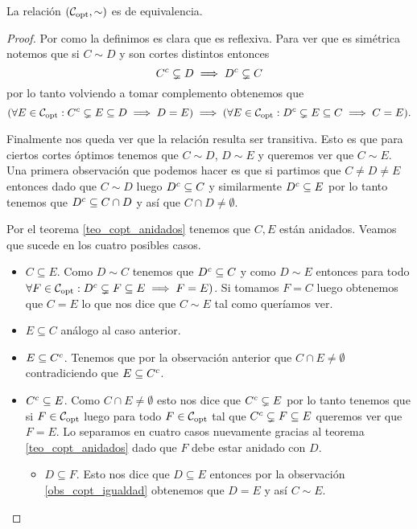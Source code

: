 \documentclass[tesis.tex]{subfiles}
\begin{document}
\begin{prop}
	La relación $({\cal C}_{\text{opt}}, \sim)$ es de equivalencia.
\end{prop}
\begin{proof}
	Por como la definimos es clara que es reflexiva.
	Para ver que es simétrica notemos que si $C \sim D$ y son cortes distintos entonces  
	\[
		C^{c} \subsetneq D \implies D^{c} \subsetneq C
	\]
	por lo tanto volviendo a tomar complemento obtenemos que
	\[
(	\forall E \in {\cal C}_{\text{opt}} : C^{c} \subsetneq E \subseteq D \implies D = E) \implies 
	(\forall E \in {\cal C}_{\text{opt}} : D^{c} \subsetneq E \subseteq C \implies C = E).
	\]
	
	Finalmente nos queda ver que la relación resulta ser transitiva.
	Esto es que para ciertos cortes óptimos tenemos que $C \sim D$, $D \sim E$ y queremos ver que $C \sim E$.
	Una primera observación que podemos hacer es que si partimos que $C \neq D \neq E$ entonces dado que $C \sim D$ luego $D^{c} \subseteq C$ y similarmente $D^{c} \subseteq E$ por lo tanto tenemos que $D^{c} \subseteq C \cap D$ y así que $C \cap D \neq \emptyset$.

	Por el teorema \ref{teo_copt_anidados} tenemos que $C,E$ están anidados.
	Veamos que sucede en los cuatro posibles casos.
	\begin{itemize}
		\item $C \subseteq E$. 
		Como $D \sim C$ tenemos que $ D^{c} \subseteq C $ y como $D \sim E$ entonces para todo $\forall F \in {\cal C}_{\text{opt}} : D^{c} \subsetneq F \subseteq E \implies F = E)$. 
		Si tomamos $F = C$ luego obtenemos que $C = E$ lo que nos dice que $C \sim E$ tal como queríamos ver.
		
		
		\item $E \subseteq C$ análogo al caso anterior.
		\item $E \subseteq C^{c}$.
		Tenemos que por la observación anterior que $C \cap E \neq \emptyset$ contradiciendo que $E \subseteq C^{c}$.
		\item $C^{c} \subseteq E$.
		Como $C \cap E \neq \emptyset$ esto nos dice que $C^{c} \subsetneq E$ por lo tanto tenemos que si $F \in {\cal C}_{\text{opt}}$ luego para todo $F \in {\cal C}_{\text{opt}}$ tal que $C^{c} \subsetneq F \subseteq E$ queremos ver que $F=E$.
		Lo separamos en cuatro casos nuevamente gracias al teorema \ref{teo_copt_anidados} dado que $F$ debe estar anidado con $D$.
		\begin{itemize}
			\item $D \subseteq F$.
			Esto nos dice que $D \subseteq E$ entonces por la observación \ref{obs_copt_igualdad} obtenemos que $D = E$ y así $C \sim E$.
			

\end{itemize}
\end{itemize}
\end{proof}
\end{document}
